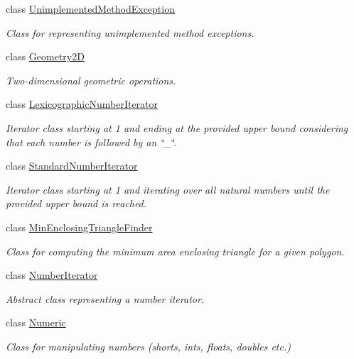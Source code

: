 \begin{DoxyCompactItemize}
class \hyperlink{classmultiscale_1_1UnimplementedMethodException}{Unimplemented\-Method\-Exception}
\begin{DoxyCompactList}\small\item\em Class for representing unimplemented method exceptions. \end{DoxyCompactList}\item 
class \hyperlink{classmultiscale_1_1Geometry2D}{Geometry2\-D}
\begin{DoxyCompactList}\small\item\em Two-\/dimensional geometric operations. \end{DoxyCompactList}\item 
class \hyperlink{classmultiscale_1_1LexicographicNumberIterator}{Lexicographic\-Number\-Iterator}
\begin{DoxyCompactList}\small\item\em Iterator class starting at 1 and ending at the provided upper bound considering that each number is followed by an \char`\"{}\-\_\-\char`\"{}. \end{DoxyCompactList}\item 
class \hyperlink{classmultiscale_1_1StandardNumberIterator}{Standard\-Number\-Iterator}
\begin{DoxyCompactList}\small\item\em Iterator class starting at 1 and iterating over all natural numbers until the provided upper bound is reached. \end{DoxyCompactList}\item 
class \hyperlink{classmultiscale_1_1MinEnclosingTriangleFinder}{Min\-Enclosing\-Triangle\-Finder}
\begin{DoxyCompactList}\small\item\em Class for computing the minimum area enclosing triangle for a given polygon. \end{DoxyCompactList}\item 
class \hyperlink{classmultiscale_1_1NumberIterator}{Number\-Iterator}
\begin{DoxyCompactList}\small\item\em Abstract class representing a number iterator. \end{DoxyCompactList}\item 
class \hyperlink{classmultiscale_1_1Numeric}{Numeric}
\begin{DoxyCompactList}\small\item\em Class for manipulating numbers (shorts, ints, floats, doubles etc.) \end{DoxyCompactList}\item 

\end{DoxyCompactItemize}
